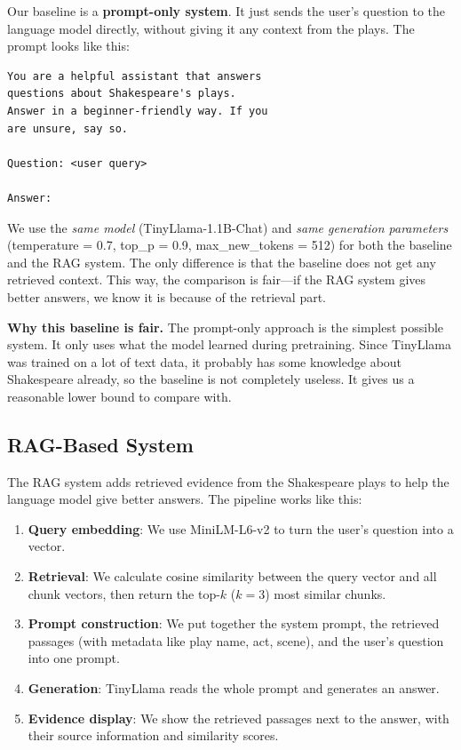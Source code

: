 \documentclass[10pt,conference]{IEEEtran}
\begin{document}
Our baseline is a \textbf{prompt-only system}. It just sends the user's question to the language model directly, without giving it any context from the plays. The prompt looks like this:

\begin{lstlisting}[language={}]
You are a helpful assistant that answers
questions about Shakespeare's plays.
Answer in a beginner-friendly way. If you
are unsure, say so.

Question: <user query>

Answer:
\end{lstlisting}

We use the \textit{same model} (TinyLlama-1.1B-Chat) and \textit{same generation parameters} (temperature = 0.7, top\_p = 0.9, max\_new\_tokens = 512) for both the baseline and the RAG system. The only difference is that the baseline does not get any retrieved context. This way, the comparison is fair---if the RAG system gives better answers, we know it is because of the retrieval part.

\textbf{Why this baseline is fair.} The prompt-only approach is the simplest possible system. It only uses what the model learned during pretraining. Since TinyLlama was trained on a lot of text data, it probably has some knowledge about Shakespeare already, so the baseline is not completely useless. It gives us a reasonable lower bound to compare with.

\subsection{RAG-Based System}

The RAG system adds retrieved evidence from the Shakespeare plays to help the language model give better answers. The pipeline works like this:

\begin{enumerate}
    \item \textbf{Query embedding}: We use MiniLM-L6-v2 to turn the user's question into a vector.
    \item \textbf{Retrieval}: We calculate cosine similarity between the query vector and all chunk vectors, then return the top-$k$ ($k=3$) most similar chunks.
    \item \textbf{Prompt construction}: We put together the system prompt, the retrieved passages (with metadata like play name, act, scene), and the user's question into one prompt.
    \item \textbf{Generation}: TinyLlama reads the whole prompt and generates an answer.
    \item \textbf{Evidence display}: We show the retrieved passages next to the answer, with their source information and similarity scores.
\end{enumerate}
\end{document}
